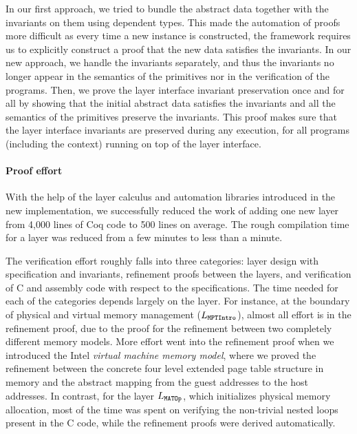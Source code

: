 In our first approach, we tried to bundle the abstract data together
with the invariants on them using dependent types. This made the
automation of proofs more difficult as every time a new instance is
constructed, the framework requires us to explicitly construct a proof
that the new data satisfies the invariants. In our new approach, we
handle the invariants separately, and thus the invariants no longer
appear in the semantics of the primitives nor in the verification of
the programs. Then, we prove the layer interface invariant
preservation once and for all by showing that the initial abstract
data satisfies the invariants and all the semantics of the primitives
preserve the invariants. This proof makes sure that the layer
interface invariants are preserved during any execution, for all
programs (including the context) running on top of the layer
interface.


\paragraph{Proof effort}
With the help of the layer calculus and automation libraries
introduced in the new implementation, we successfully reduced the work
of adding one new layer from 4,000 lines of Coq code to 500 lines on
average.  The rough compilation time for a layer was reduced from a
few minutes to less than a minute.

The verification effort roughly falls into three categories: layer
design with specification and invariants, refinement proofs between
the layers, and verification of C and assembly code with respect to
the specifications. The time needed for each of the categories depends
largely on the layer.  For instance, at the boundary of physical and
virtual memory management ({$L_{\texttt{MPTIntro}}$}), almost all effort
is in the refinement proof, due to the proof for the refinement between
two completely different memory models. More effort went into the
refinement proof when we introduced the Intel \emph{virtual machine
memory model}, where we proved the refinement between the concrete
four level extended page table structure in memory and the abstract
mapping from the guest addresses to the host addresses.
In contrast, for the layer {$L_{\texttt{MATOp}}$},
which initializes physical memory allocation,
most of the time was spent on verifying
the non-trivial nested loops present in the C code,
while the refinement proofs were derived automatically. 

